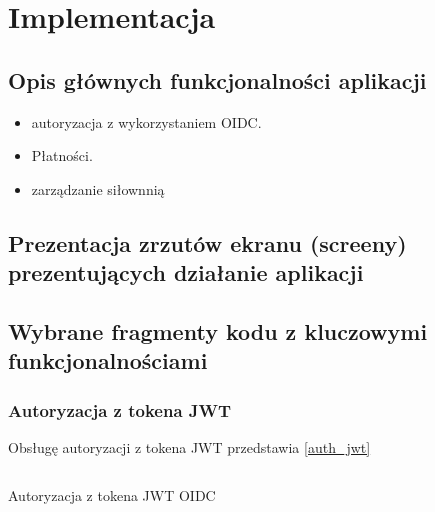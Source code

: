 \documentclass[../../spr.tex]{subfiles}
\begin{document}
\section{Implementacja}

\subsection{Opis głównych funkcjonalności aplikacji}

\begin{itemize}
  \item autoryzacja z wykorzystaniem OIDC.
  \item Płatności.
  \item zarządzanie siłownnią
\end{itemize}

\subsection{Prezentacja zrzutów ekranu (screeny) prezentujących działanie aplikacji}

\subsection{Wybrane fragmenty kodu z kluczowymi funkcjonalnościami}


\subsubsection{Autoryzacja z tokena JWT}

Obsługę autoryzacji z tokena JWT przedstawia \cref{auth_jwt}

\begin{listing}
  \inputminted[breaklines, fontsize=\footnotesize, breakanywhere, firstline=18, numbers=left]
  {java}{./sections/implementacja/GymJwtAuthenticationConverter.java}
  \caption{Autoryzacja z tokena JWT OIDC}
  \label{auth_jwt}
\end{listing}

\subsubsection{}
\end{document}
